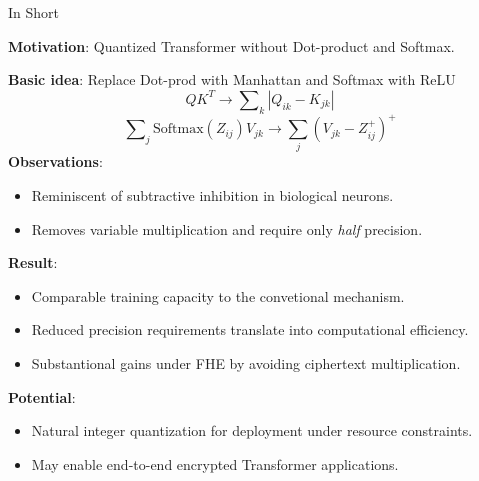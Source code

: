 \documentclass[12pt,oneside]{book}
\begin{document}

\begin{center}
    \Huge In Short
\end{center}    

\Large
\noindent
\textbf{Motivation}: Quantized Transformer without Dot-product and Softmax.
\vspace{0.1cm}

\noindent
\textbf{Basic idea}: 
Replace Dot-prod with Manhattan and Softmax with ReLU
\begin{equation*}
Q K^T \rightarrow \sum\nolimits_{k} \left|Q_{ik} - K_{jk}\right|
\end{equation*}
\begin{equation*}
\sum\nolimits_{j} \mathrm{Softmax} \left(Z_{ij}\right) V_{jk}  \rightarrow \sum_j \left( V_{jk} - Z_{ij}^+  \right)^+
    \label{eq:inhibition}
\end{equation*}
%
\noindent
\textbf{Observations}:
\begin{itemize}
    \item Reminiscent of subtractive inhibition in biological neurons.
    \item Removes variable multiplication and require only \textit{half} precision.
\end{itemize}

\noindent
\textbf{Result}: 

\begin{itemize}
    \item Comparable training capacity to the convetional mechanism.
    \item Reduced precision requirements translate into computational efficiency.
    \item Substantional gains under FHE by avoiding ciphertext multiplication.
\end{itemize}

\noindent
\textbf{Potential}: 
\begin{itemize}
    \item Natural integer quantization for deployment under resource constraints.
    \item May enable end-to-end encrypted Transformer applications.
\end{itemize}
\end{document}
